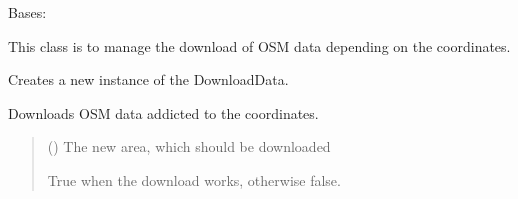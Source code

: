 \documentclass[letterpaper,10pt,english]{sphinxmanual}
\begin{document}
\begin{fulllineitems}
\label{\detokenize{apidoc/src.osm_configurator.model.project.configuration:src.osm_configurator.model.project.configuration.download_data.DownloadData}}
\pysigstartsignatures
{}
\pysigstopsignatures
\sphinxAtStartPar
Bases: 

\sphinxAtStartPar
This class is to manage the download of OSM data depending on the coordinates.

\begin{fulllineitems}
\label{\detokenize{apidoc/src.osm_configurator.model.project.configuration:src.osm_configurator.model.project.configuration.download_data.DownloadData.__init__}}
\pysigstartsignatures
{}
\pysigstopsignatures
\sphinxAtStartPar
Creates a new instance of the DownloadData.

\end{fulllineitems}


\begin{fulllineitems}
\label{\detokenize{apidoc/src.osm_configurator.model.project.configuration:src.osm_configurator.model.project.configuration.download_data.DownloadData.download_data}}
\pysigstartsignatures
{}
\pysigstopsignatures
\sphinxAtStartPar
Downloads OSM data addicted to the coordinates.
\begin{quote}\begin{description}
\sphinxAtStartPar
{} () \textendash{} The new area, which should be downloaded

\sphinxAtStartPar
True when the download works, otherwise false.

\sphinxAtStartPar
{}

\end{description}\end{quote}

\end{fulllineitems}


\end{fulllineitems}
\end{document}
